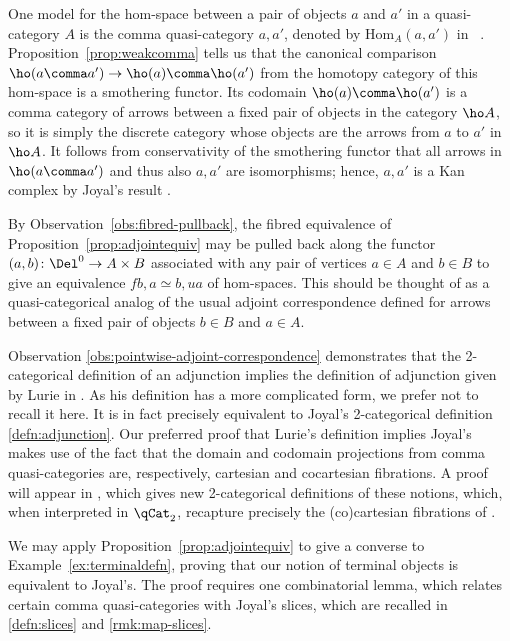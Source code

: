 \begin{obs}\label{obs:pointwise-adjoint-correspondence} One model for the hom-space between a pair of objects $a$ and $a'$ in a quasi-category $A$ is the comma quasi-category $a \comma a'$, denoted by $\mathrm{Hom}_A(a,a')$ in~ \cite{Lurie:2009fk}. Proposition~\ref{prop:weakcomma} tells us that the canonical comparison $\ho(a\comma a')\to \ho(a)\comma \ho(a')$ from the homotopy category of this hom-space is a smothering functor. Its codomain $\ho(a)\comma\ho(a')$ is a comma category of arrows between a fixed pair of objects in the category $\ho A$, so it is simply the discrete category whose objects are the arrows from $a$ to $a'$ in $\ho A$. It follows from conservativity of the smothering functor that all arrows in $\ho(a\comma a')$ and thus also $a\comma a'$ are isomorphisms; hence,  $a\comma a'$ is a Kan complex by Joyal's result \cite[1.4]{Joyal:2002:QuasiCategories}.

By Observation~\ref{obs:fibred-pullback}, the fibred equivalence of Proposition~\ref{prop:adjointequiv} may be pulled back along the functor $(a,b)\colon\Del^0\to A\times B$ associated with any pair of vertices $a\in A$ and $b\in B$ to give an equivalence $fb \comma a \simeq b \comma ua$ of hom-spaces. This should be thought of as a quasi-categorical analog of the usual adjoint correspondence defined for arrows between a fixed pair of objects $b \in B$ and $a \in A$. 
\end{obs}

\begin{rmk}\label{rmk:vs-lurie-adjunction}
Observation \ref{obs:pointwise-adjoint-correspondence} demonstrates that the 2-categorical definition of an adjunction implies the definition of adjunction given by Lurie in \cite[5.2.2.8]{Lurie:2009fk}. As his definition has a more complicated form, we prefer not to recall it here. It is in fact precisely equivalent to Joyal's 2-categorical definition \ref{defn:adjunction}. Our preferred proof that Lurie's definition implies Joyal's makes use of the fact that the domain and codomain projections from comma quasi-categories are, respectively, cartesian and cocartesian fibrations. A proof will appear in \cite{RiehlVerity:2015fy}, which gives new 2-categorical definitions of these notions, which, when interpreted in $\qCat_2$, recapture precisely the (co)cartesian fibrations of \cite{Lurie:2009fk}.
\end{rmk}

We may apply Proposition~\ref{prop:adjointequiv}  to give a converse to Example~\ref{ex:terminaldefn}, proving that our notion of terminal objects is equivalent to Joyal's. The proof requires one combinatorial lemma, which relates certain comma quasi-categories with Joyal's slices, which are recalled in \ref{defn:slices} and \ref{rmk:map-slices}.

